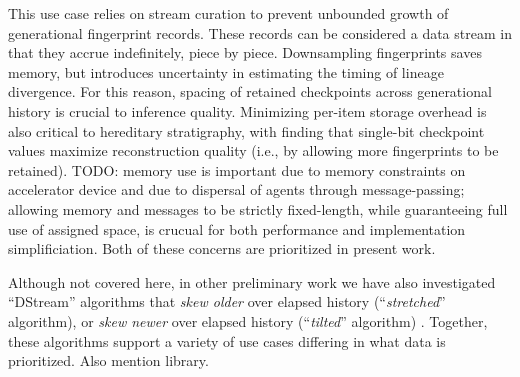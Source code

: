 This use case relies on stream curation to prevent unbounded growth of generational fingerprint records.
These records can be considered a data stream in that they accrue indefinitely, piece by piece.
Downsampling fingerprints saves memory, but introduces uncertainty in estimating the timing of lineage divergence.
For this reason, spacing of retained checkpoints across generational history is crucial to inference quality.
Minimizing per-item storage overhead is also critical to hereditary stratigraphy, with \citet{moreno2024guide} finding that single-bit checkpoint values maximize reconstruction quality (i.e., by allowing more fingerprints to be retained).
TODO: memory use is important due to memory constraints on accelerator device and due to dispersal of agents through message-passing; allowing memory and messages to be strictly fixed-length, while guaranteeing full use of assigned space, is crucual for both performance and implementation simplificiation.
Both of these concerns are prioritized in present work.

Although not covered here, in other preliminary work we have also investigated ``DStream'' algorithms that \textit{skew older} over elapsed history (``\textit{stretched}'' algorithm), or \textit{skew newer} over elapsed history (``\textit{tilted}'' algorithm) \citep{moreno2024structured}.
Together, these algorithms support a variety of use cases differing in what data is prioritized.
Also mention library.




%

%

%
